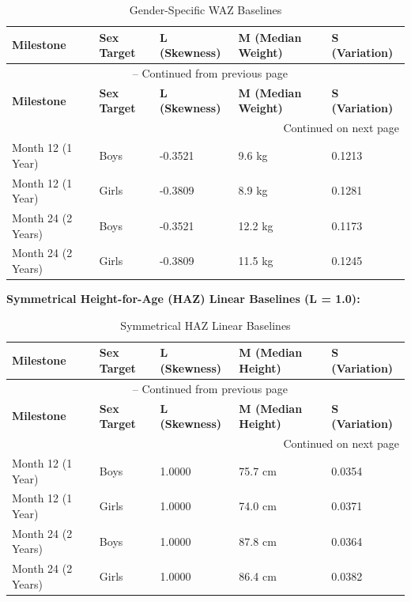 \documentclass[12pt, a4paper]{report}
\begin{document}
\vspace{0.3cm}
\begin{longtable}{p{3cm} p{2cm} p{2.5cm} p{2.5cm} p{2.5cm}}
    \caption{Gender-Specific WAZ Baselines} \label{tab:waz} \\
    \toprule
    \textbf{Milestone} & \textbf{Sex Target} & \textbf{L (Skewness)} & \textbf{M (Median Weight)} & \textbf{S (Variation)} \\
    \midrule
    \endfirsthead
    \multicolumn{5}{c}{{\tablename\ \thetable{} -- Continued from previous page}} \\
    \toprule
    \textbf{Milestone} & \textbf{Sex Target} & \textbf{L (Skewness)} & \textbf{M (Median Weight)} & \textbf{S (Variation)} \\
    \midrule
    \endhead
    \midrule
    \multicolumn{5}{r}{{Continued on next page}} \\
    \endfoot
    \bottomrule
    \endlastfoot
    Month 12 (1 Year) & Boys & -0.3521 & 9.6 kg & 0.1213 \\
    \addlinespace
    Month 12 (1 Year) & Girls & -0.3809 & 8.9 kg & 0.1281 \\
    \addlinespace
    Month 24 (2 Years) & Boys & -0.3521 & 12.2 kg & 0.1173 \\
    \addlinespace
    Month 24 (2 Years) & Girls & -0.3809 & 11.5 kg & 0.1245 \\
\end{longtable}
\vspace{0.3cm}

\noindent \textbf{Symmetrical Height-for-Age (HAZ) Linear Baselines (L = 1.0):}

\vspace{0.3cm}
\begin{longtable}{p{3cm} p{2cm} p{2.5cm} p{2.5cm} p{2.5cm}}
    \caption{Symmetrical HAZ Linear Baselines} \label{tab:haz} \\
    \toprule
    \textbf{Milestone} & \textbf{Sex Target} & \textbf{L (Skewness)} & \textbf{M (Median Height)} & \textbf{S (Variation)} \\
    \midrule
    \endfirsthead
    \multicolumn{5}{c}{{\tablename\ \thetable{} -- Continued from previous page}} \\
    \toprule
    \textbf{Milestone} & \textbf{Sex Target} & \textbf{L (Skewness)} & \textbf{M (Median Height)} & \textbf{S (Variation)} \\
    \midrule
    \endhead
    \midrule
    \multicolumn{5}{r}{{Continued on next page}} \\
    \endfoot
    \bottomrule
    \endlastfoot
    Month 12 (1 Year) & Boys & 1.0000 & 75.7 cm & 0.0354 \\
    \addlinespace
    Month 12 (1 Year) & Girls & 1.0000 & 74.0 cm & 0.0371 \\
    \addlinespace
    Month 24 (2 Years) & Boys & 1.0000 & 87.8 cm & 0.0364 \\
    \addlinespace
    Month 24 (2 Years) & Girls & 1.0000 & 86.4 cm & 0.0382 \\
\end{longtable}
\vspace{0.3cm}
\end{document}
